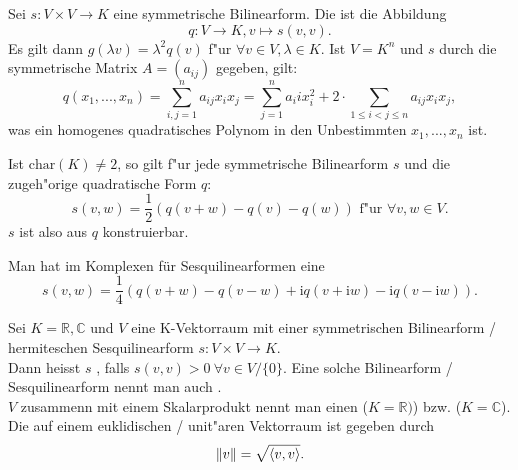 \documentclass[11pt, a4paper]{article}
\begin{document}
\begin{definition}
Sei $s: V \times V \rightarrow K$ eine symmetrische Bilinearform. Die  ist die Abbildung
\begin{equation*}
q : V \rightarrow K, v \mapsto s(v, v).
\end{equation*}
Es gilt dann $g(\lambda v) = \lambda^2 q(v)$ f"ur  $\forall v \in V, \lambda \in K$.
Ist $V = K^n$ und $s$ durch die symmetrische Matrix $A = (a_{ij})$ gegeben, gilt:
\begin{equation*}
q(x_1, ..., x_n) = \sum\limits_{i, j = 1}^n a_{ij} x_i x_j = \sum\limits_{j = 1}^n a_ii x_i^2 + 2 \cdot \sum\limits_{1 \leq i < j \leq n} a_{ij}x_ix_j,
\end{equation*}
was ein homogenes quadratisches Polynom in den Unbestimmten $x_1, ..., x_n$ ist.
\end{definition}

\begin{theorem} 
Ist $\textrm{char}(K) \neq 2$, so gilt f"ur jede symmetrische Bilinearform $s$ und die zugeh"orige quadratische Form $q$:
\begin{equation*}
s(v, w) = \frac{1}{2}(q(v+w)-q(v)-q(w)) \text{ f"ur } \forall v, w \in V.
\end{equation*}
$s$ ist also aus $q$ konstruierbar.
\end{theorem}

\begin{theorem} 
Man hat im Komplexen für Sesquilinearformen eine 
\begin{equation*}
s(v, w)=\frac{1}{4}(q(v+w)-q(v-w)+\mathrm{i} q(v+\mathrm{i} w)-\mathrm{i} q(v-\mathrm{i} w)).
\end{equation*}
\end{theorem}

\begin{definition}
Sei $K = \mathbb{R}, \mathbb{C}$ und $V$ eine K-Vektorraum mit einer symmetrischen Bilinearform / hermiteschen Sesquilinearform $s : V \times V \rightarrow K$. 
\\ Dann heisst $s$ , falls $s(v, v) > 0 \ \forall v \in V/\{0\}$.
Eine solche Bilinearform / Sesquilinearform nennt man auch .
\\$V$ zusammenn mit einem Skalarprodukt nennt man einen  ($K = \mathbb{R})$) bzw.  ($K = \mathbb{C}$).
\\Die {} auf einem euklidischen / unit"aren Vektorraum ist gegeben durch
\begin{equation*}
\\
\| v\| = \sqrt{\left\langle v , v \right\rangle}.
\end{equation*}
\end{definition}
\end{document}
